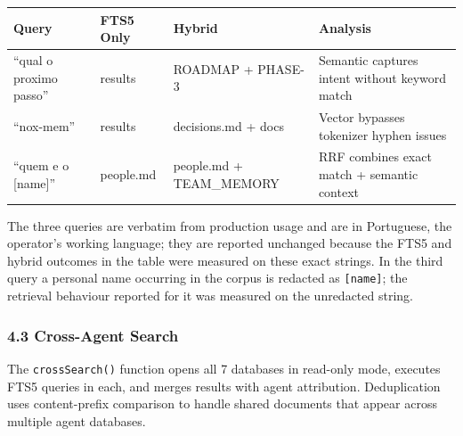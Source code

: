 \documentclass[
]{article}
\newcounter{none} %
\begin{document}
{\def\LTcaptype{none} %
\begin{longtable}[]{@{}
  >{\raggedright\arraybackslash}p{}
  >{\raggedright\arraybackslash}p{}
  >{\raggedright\arraybackslash}p{}
  >{\raggedright\arraybackslash}p{}@{}}
\toprule\noalign{}
\begin{minipage}[b]{\linewidth}\raggedright
Query
\end{minipage} & \begin{minipage}[b]{\linewidth}\raggedright
FTS5 Only
\end{minipage} & \begin{minipage}[b]{\linewidth}\raggedright
Hybrid
\end{minipage} & \begin{minipage}[b]{\linewidth}\raggedright
Analysis
\end{minipage} \\
\midrule\noalign{}
\endhead
\bottomrule\noalign{}
\endlastfoot
``qual o proximo passo'' & 0 results & ROADMAP + PHASE-3 & Semantic
captures intent without keyword match \\
``nox-mem'' & 0 results & decisions.md + docs & Vector bypasses
tokenizer hyphen issues \\
``quem e o {[}name{]}'' & people.md & people.md + TEAM\_MEMORY & RRF
combines exact match + semantic context \\
\end{longtable}
}

The three queries are verbatim from production usage and are in
Portuguese, the operator's working language; they are reported unchanged
because the FTS5 and hybrid outcomes in the table were measured on these
exact strings. In the third query a personal name occurring in the
corpus is redacted as \texttt{{[}name{]}}; the retrieval behaviour
reported for it was measured on the unredacted string.

\subsubsection{4.3 Cross-Agent Search}\label{cross-agent-search}

The \texttt{crossSearch()} function opens all 7 databases in read-only
mode, executes FTS5 queries in each, and merges results with agent
attribution. Deduplication uses content-prefix comparison to handle
shared documents that appear across multiple agent databases.
\end{document}
